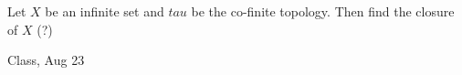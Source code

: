 \begin{samepage}
\begin{ex}
Let $X$ be an infinite set and $tau$ be the co-finite topology. Then find the closure of $X$ (?)
\end{ex}
\begin{source}
Class, Aug 23
\end{source}
\end{samepage}
